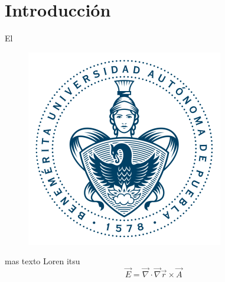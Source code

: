 \chapter{Introducción}
El 
\begin{figure}[!h]
\centering
\includegraphics[width=.2\textwidth,keepaspectratio=true]{escudo-2}
\end{figure}

mas texto Loren itsu
\[ \vec E = \vec \nabla \cdot \vec \nabla \vec r \times \vec A
\]
